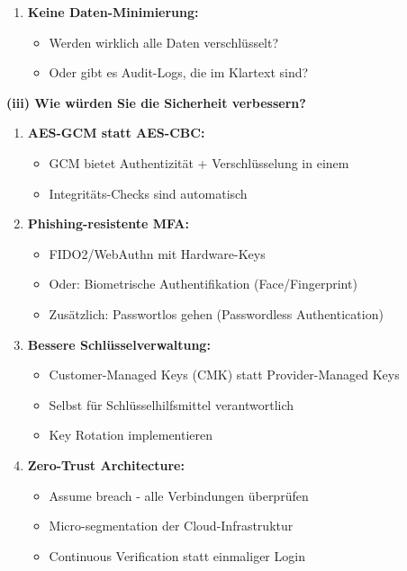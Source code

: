 \documentclass[12pt,a4paper]{article}
\begin{document}
\begin{tcolorbox}[colback=solutionbg, colframe=black!30]
\begin{enumerate}[1.]
    \item \textbf{Keine Daten-Minimierung:}
    \begin{itemize}
        \item Werden wirklich alle Daten verschlüsselt?
        \item Oder gibt es Audit-Logs, die im Klartext sind?
    \end{itemize}
\end{enumerate}

\end{tcolorbox}
\begin{tcolorbox}[colback=solutionbg, colframe=black!30]

\textbf{(iii) Wie würden Sie die Sicherheit verbessern?} \checkmark

\begin{enumerate}[1.]
    \item \textbf{AES-GCM statt AES-CBC:}
    \begin{itemize}
        \item GCM bietet Authentizität + Verschlüsselung in einem
        \item Integritäts-Checks sind automatisch
    \end{itemize}
    
    \item \textbf{Phishing-resistente MFA:}
    \begin{itemize}
        \item FIDO2/WebAuthn mit Hardware-Keys
        \item Oder: Biometrische Authentifikation (Face/Fingerprint)
        \item Zusätzlich: Passwortlos gehen (Passwordless Authentication)
    \end{itemize}
    
    \item \textbf{Bessere Schlüsselverwaltung:}
    \begin{itemize}
        \item Customer-Managed Keys (CMK) statt Provider-Managed Keys
        \item Selbst für Schlüsselhilfsmittel verantwortlich
        \item Key Rotation implementieren
    \end{itemize}
    
    \item \textbf{Zero-Trust Architecture:}
    \begin{itemize}
        \item Assume breach - alle Verbindungen überprüfen
        \item Micro-segmentation der Cloud-Infrastruktur
        \item Continuous Verification statt einmaliger Login
    \end{itemize}
    

\end{enumerate}
\end{tcolorbox}
\end{document}
